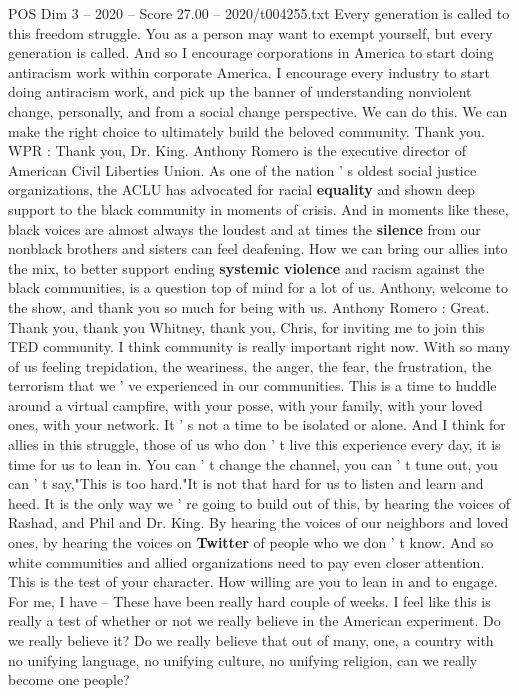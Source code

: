 \begin{textsample}{POS Dim 3 – 2020 – Score 27.00 – 2020/t004255.txt}
Every generation is called to this freedom struggle.
You as a person may want to exempt yourself, but every generation is called.
And so I encourage corporations in America to start doing antiracism work within corporate America.
I encourage every industry to start doing antiracism work, and pick up the banner of understanding nonviolent change, personally, and from a social change perspective.
We can do this.
We can make the right choice to ultimately build the beloved community.
Thank you.
WPR : Thank you, Dr.
King.
Anthony Romero is the executive director of American Civil Liberties Union.
As one of the nation ' s oldest social justice organizations, the ACLU has advocated for racial \textbf{equality} and shown deep support to the black community in moments of crisis.
And in moments like these, black voices are almost always the loudest and at times the \textbf{silence} from our nonblack brothers and sisters can feel deafening.
How we can bring our allies into the mix, to better support ending \textbf{systemic} \textbf{violence} and racism against the black communities, is a question top of mind for a lot of us.
Anthony, welcome to the show, and thank you so much for being with us.
Anthony Romero : Great.
Thank you, thank you Whitney, thank you, Chris, for inviting me to join this TED community.
I think community is really important right now.
With so many of us feeling trepidation, the weariness, the anger, the fear, the frustration, the terrorism that we ' ve experienced in our communities.
This is a time to huddle around a virtual campfire, with your posse, with your family, with your loved ones, with your network.
It ' s not a time to be isolated or alone.
And I think for allies in this struggle, those of us who don ' t live this experience every day, it is time for us to lean in.
You can ' t change the channel, you can ' t tune out, you can ' t say,"This is too hard."It is not that hard for us to listen and learn and heed.
It is the only way we ' re going to build out of this, by hearing the voices of Rashad, and Phil and Dr.
King.
By hearing the voices of our neighbors and loved ones, by hearing the voices on \textbf{Twitter} of people who we don ' t know.
And so white communities and allied organizations need to pay even closer attention.
This is the test of your character.
How willing are you to lean in and to engage.
For me, I have -- These have been really hard couple of weeks.
I feel like this is really a test of whether or not we really believe in the American experiment.
Do we really believe it?
Do we really believe that out of many, one, a country with no unifying language, no unifying culture, no unifying religion, can we really become one people?

\end{textsample}
